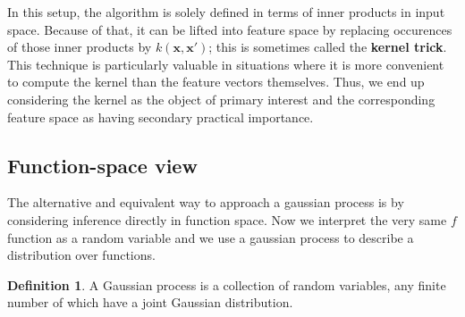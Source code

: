 \documentclass[12pt,a4paper,oneside]{book}
\theoremstyle{plain}
\theoremstyle{definition}
\newtheorem{defn}[thm]{Definition}
\begin{document}
{\vspace{3mm}\newline
In this setup, the algorithm is solely defined in terms of inner products in input space. Because of that, it can be lifted into feature space by replacing occurences of those inner products by $k(\bm{x},\bm{x}')$; this is sometimes called the \textbf{kernel trick}. This technique is particularly valuable in situations where it is more convenient to compute the kernel than the feature vectors themselves. Thus, we end up considering the kernel as the object of primary interest and the corresponding feature space as having secondary practical importance. 

\subsection{Function-space view}  
The alternative and equivalent way to approach a gaussian process is by considering inference directly in function space. Now we interpret the very same $f$ function as a random variable and we use a gaussian process to describe a distribution over functions.  

\begin{defn}
A Gaussian process is a collection of random variables, any finite number of which have a joint Gaussian distribution.
\vspace{3mm}
\end{defn}

}
\end{document}
